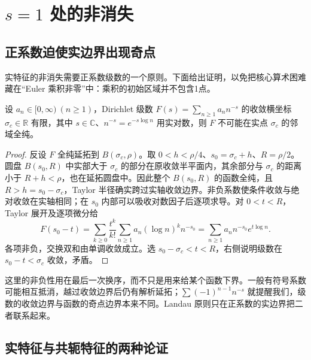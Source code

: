 \section{\texorpdfstring{\(s=1\)}{s=1} 处的非消失}
\label{b3:sec:D03}

\subsection{正系数迫使实边界出现奇点}
\label{b3:subsec:D0301}

实特征的非消失需要正系数级数的一个原则。下面给出证明，以免把核心算术困难藏在“Euler 乘积非零”中：乘积的初始区域并不包含1点。

\begin{lemma}\label{b3:lem:D-landau}
设 \(a_n\in[0,\infty)\ (n\ge1)\)，Dirichlet 级数 \(F(s)=\sum_{n\ge1}a_n n^{-s}\) 的收敛横坐标 \(\sigma_c\in\mathbb R\) 有限，其中 \(s\in\mathbb C\)、\(n^{-s}=e^{-s\log n}\) 用实对数，则 \(F\) 不可能在实点 \(\sigma_c\) 的邻域全纯。
\end{lemma}
\begin{proof}
反设 \(F\) 全纯延拓到 \(B(\sigma_c,\rho)\)。取 \(0<h<\rho/4\)、\(s_0=\sigma_c+h\)、\(R=\rho/2\)。圆盘 \(B(s_0,R)\) 中实部大于 \(\sigma_c\) 的部分在原收敛半平面内，其余部分与 \(\sigma_c\) 的距离小于 \(R+h<\rho\)，也在延拓圆盘中。因此整个 \(B(s_0,R)\) 的函数全纯，且 \(R>h=s_0-\sigma_c\)，Taylor 半径确实跨过实轴收敛边界。非负系数使条件收敛与绝对收敛在实轴相同；在 \(s_0\) 内部可以吸收对数因子后逐项求导。对 \(0<t<R\)，Taylor 展开及逐项微分给
\[
 F(s_0-t)=\sum_{k\ge0}\frac{t^k}{k!}\sum_{n\ge1}a_n(\log n)^k n^{-s_0}
        =\sum_{n\ge1}a_n n^{-s_0}e^{t\log n}.
\]
各项非负，交换双和由单调收敛成立。选 \(s_0-\sigma_c<t<R\)，右侧说明级数在 \(s_0-t<\sigma_c\) 收敛，矛盾。
\end{proof}

这里的非负性用在最后一次换序，而不只是用来给某个函数下界。一般有符号系数可能相互抵消，越过收敛边界后仍有解析延拓；\(\sum(-1)^{n-1}n^{-s}\) 就提醒我们，级数的收敛边界与函数的奇点边界本来不同。Landau 原则只在正系数的实边界把二者联系起来。

\subsection{实特征与共轭特征的两种论证}
\label{b3:subsec:D0302}

